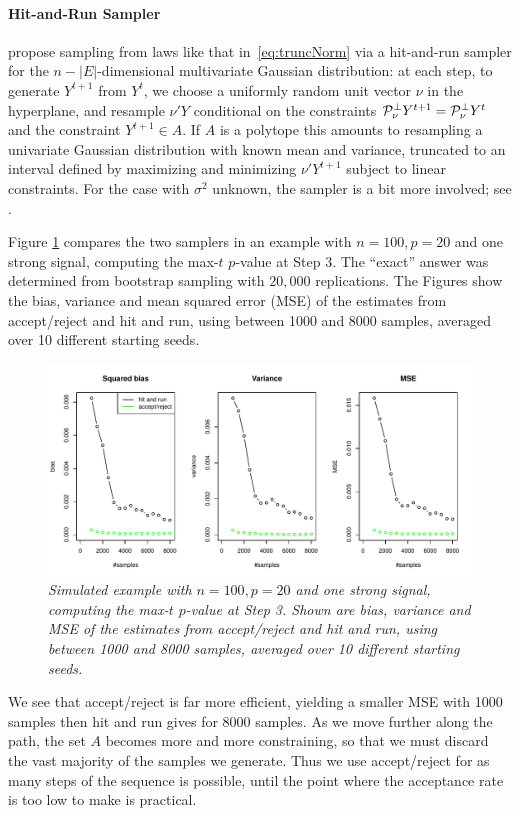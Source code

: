 \documentclass{article}
\begin{document}
\paragraph{Hit-and-Run Sampler} \citet{fithian2014optimal} propose sampling from laws like that in~\eqref{eq:truncNorm} via a hit-and-run sampler for the $n-|E|$-dimensional multivariate Gaussian distribution: at each step, to generate $Y^{t+1}$ from $Y^t$, we choose a uniformly random unit vector $\nu$ in the hyperplane, and resample $\nu'Y$ conditional on the constraints $\mathcal{P}_{\nu}^\perp Y^{t+1}=\mathcal{P}_{\nu}^\perp Y^t$ and the constraint $Y^{t+1}\in A$. If $A$ is a polytope this amounts to resampling a univariate Gaussian distribution with known mean and variance, truncated to an interval defined by maximizing and minimizing $\nu'Y^{t+1}$ subject to linear constraints. For the case with $\sigma^2$ unknown, the sampler is a bit more involved; see \citet{fithian2014optimal}.

Figure \ref{fig:comparison} compares the two samplers in an example with $n=100, p=20$ and one strong signal, computing the max-$t$ $p$-value at Step 3.
The ``exact'' answer was determined from bootstrap sampling with $20,000$ replications.
The Figures show the bias, variance and mean squared error (MSE) of the estimates from accept/reject and hit and run, using between 1000 and 8000 samples, averaged
over 10 different starting seeds.
\begin{figure}[htp]
\centering
  \includegraphics[width=\textwidth]{figs/comparison.pdf}
  \caption{\em Simulated example with $n= 100, p=20$ and one strong signal, computing the max-$t$ $p$-value at Step 3.  Shown are bias, variance and MSE of the estimates from accept/reject and hit and run, using between 1000 and 8000 samples, averaged over 10 different starting seeds.
}
\label{fig:comparison}
\end{figure}
We see that accept/reject is far more efficient, yielding a smaller MSE with 1000 samples then hit and run gives for 8000 samples. As we move further along the path, the set $A$ becomes more and more constraining, so that we must discard the vast majority of the samples we generate. Thus we use accept/reject for as many steps of the sequence is possible,  until the point where the acceptance rate is too low to make is practical.
\end{document}
